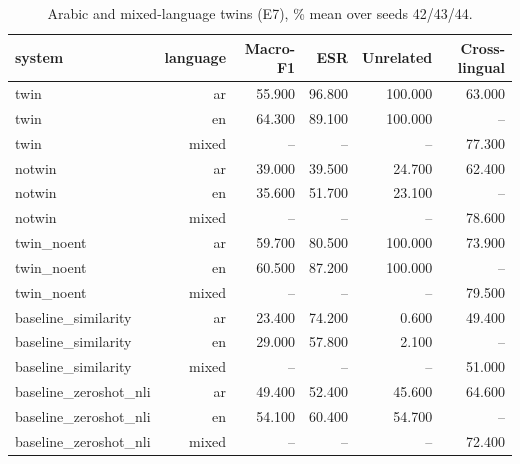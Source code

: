 \begin{table}[t]
\centering
\caption{Arabic and mixed-language twins (E7), \% mean over seeds 42/43/44.}
\label{tab:tab_arabic_E7}
\begin{tabular}{lrrrrr}
\toprule
system & language & Macro-F1 & ESR & Unrelated & Cross-lingual \\
\midrule
twin & ar & 55.900 & 96.800 & 100.000 & 63.000 \\
twin & en & 64.300 & 89.100 & 100.000 & – \\
twin & mixed & – & – & – & 77.300 \\
notwin & ar & 39.000 & 39.500 & 24.700 & 62.400 \\
notwin & en & 35.600 & 51.700 & 23.100 & – \\
notwin & mixed & – & – & – & 78.600 \\
twin\_noent & ar & 59.700 & 80.500 & 100.000 & 73.900 \\
twin\_noent & en & 60.500 & 87.200 & 100.000 & – \\
twin\_noent & mixed & – & – & – & 79.500 \\
baseline\_similarity & ar & 23.400 & 74.200 & 0.600 & 49.400 \\
baseline\_similarity & en & 29.000 & 57.800 & 2.100 & – \\
baseline\_similarity & mixed & – & – & – & 51.000 \\
baseline\_zeroshot\_nli & ar & 49.400 & 52.400 & 45.600 & 64.600 \\
baseline\_zeroshot\_nli & en & 54.100 & 60.400 & 54.700 & – \\
baseline\_zeroshot\_nli & mixed & – & – & – & 72.400 \\
\bottomrule
\end{tabular}
\end{table}
